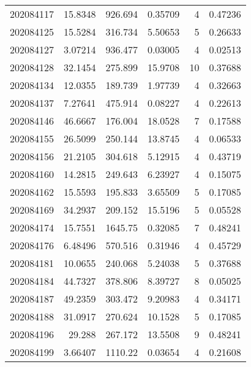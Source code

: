 \begin{tabular}{rrrrrr}
 202084117 &         15.8348  &      926.694  &            0.35709 &           4 & 0.47236 \\
 202084125 &         15.5284  &      316.734  &            5.50653 &           5 & 0.26633 \\
 202084127 &          3.07214 &      936.477  &            0.03005 &           4 & 0.02513 \\
 202084128 &         32.1454  &      275.899  &           15.9708  &          10 & 0.37688 \\
 202084134 &         12.0355  &      189.739  &            1.97739 &           4 & 0.32663 \\
 202084137 &          7.27641 &      475.914  &            0.08227 &           4 & 0.22613 \\
 202084146 &         46.6667  &      176.004  &           18.0528  &           7 & 0.17588 \\
 202084155 &         26.5099  &      250.144  &           13.8745  &           4 & 0.06533 \\
 202084156 &         21.2105  &      304.618  &            5.12915 &           4 & 0.43719 \\
 202084160 &         14.2815  &      249.643  &            6.23927 &           4 & 0.15075 \\
 202084162 &         15.5593  &      195.833  &            3.65509 &           5 & 0.17085 \\
 202084169 &         34.2937  &      209.152  &           15.5196  &           5 & 0.05528 \\
 202084174 &         15.7551  &     1645.75   &            0.32085 &           7 & 0.48241 \\
 202084176 &          6.48496 &      570.516  &            0.31946 &           4 & 0.45729 \\
 202084181 &         10.0655  &      240.068  &            5.24038 &           5 & 0.37688 \\
 202084184 &         44.7327  &      378.806  &            8.39727 &           8 & 0.05025 \\
 202084187 &         49.2359  &      303.472  &            9.20983 &           4 & 0.34171 \\
 202084188 &         31.0917  &      270.624  &           10.1528  &           5 & 0.17085 \\
 202084196 &         29.288   &      267.172  &           13.5508  &           9 & 0.48241 \\
 202084199 &          3.66407 &     1110.22   &            0.03654 &           4 & 0.21608 \\

\end{tabular}
